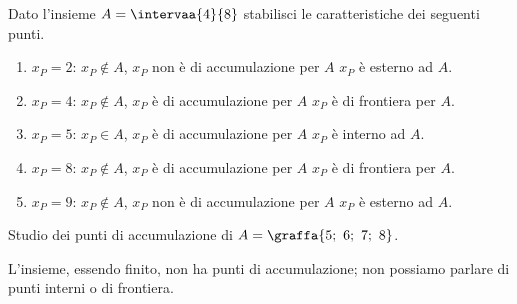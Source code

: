 
\begin{esempio}
Dato l'insieme \(A = \intervaa{4}{8}\) 
stabilisci le caratteristiche dei seguenti punti.
\begin{enumerate} [label=\alph*)]
\item \(x_P= 2\): \quad  \(x_P \notin A\), 
\(x_P\) non è di accumulazione per \(A\) \(x_P\) è esterno ad \(A\).
\item \(x_P= 4\): \quad  \(x_P \notin A\), 
\(x_P\) è di accumulazione per \(A\) \(x_P\) è di frontiera per \(A\).
\item \(x_P= 5\): \quad  \(x_P \in A\), 
\(x_P\) è di accumulazione per \(A\) \(x_P\) è interno ad \(A\).
\item \(x_P= 8\): \quad  \(x_P \notin A\), 
\(x_P\) è di accumulazione per \(A\) \(x_P\) è di frontiera per \(A\).
\item \(x_P= 9\): \quad  \(x_P \notin A\), 
\(x_P\) non è di accumulazione per \(A\) \(x_P\) è esterno ad \(A\).
\end{enumerate}
\end{esempio}

\begin{esempio}
Studio dei punti di accumulazione di \(A=\graffa{5;~6;~7;~8}\).

L'insieme, essendo finito, non ha punti di accumulazione; 
non possiamo parlare di punti interni o di frontiera.
\end{esempio}

